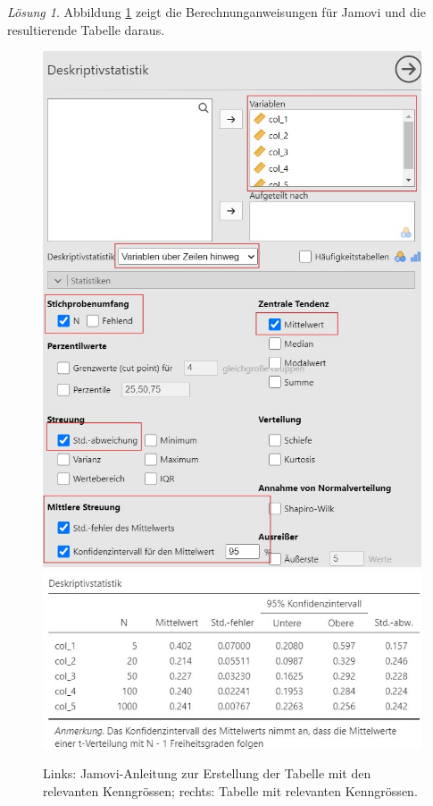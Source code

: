 \documentclass[
]{book}
\theoremstyle{definition}
\theoremstyle{definition}
\theoremstyle{definition}
\theoremstyle{definition}
\theoremstyle{remark}
\newtheorem*{solution}{Lösung}
\begin{document}
\begin{solution}

Abbildung \ref{fig:sol-ki-mean-n-vary} zeigt die Berechnunganweisungen für Jamovi und die resultierende Tabelle daraus.

\begin{figure}
\includegraphics[width=0.5\linewidth]{figures/04-exr-stichprobengroesse-jmv-input} \includegraphics[width=0.5\linewidth]{figures/04-exr-stichprobengroesse-jmv-output} \caption{Links: Jamovi-Anleitung zur Erstellung der Tabelle mit den relevanten Kenngrössen; rechts: Tabelle mit relevanten Kenngrössen.}\label{fig:sol-ki-mean-n-vary}
\end{figure}


\end{solution}
\end{document}
